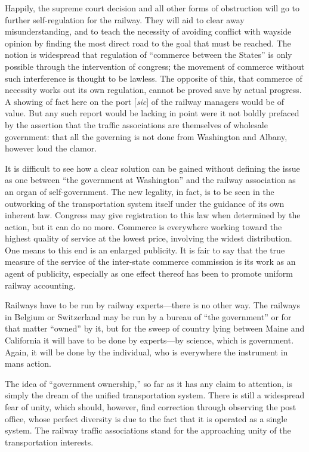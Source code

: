 \documentclass[twoside,symmetric,nobib,justified]{tufte-book}
\begin{document}
Happily, the supreme court decision and all other forms of obstruction
will go to further self-regulation for the railway. They will aid to
clear away misunderstanding, and to teach the necessity of avoiding
conflict with wayside opinion by finding the most direct road to the
goal that must be reached. The notion is widespread that regulation of
``commerce between the States'' is only possible through the
intervention of congress; the movement of commerce without such
interference is thought to be lawless. The opposite of this, that
commerce of necessity works out its own regulation, cannot be proved
save by actual progress. A showing of fact here on the port
{[}\emph{sic}{]} of the railway managers would be of value. But any such
report would be lacking in point were it not boldly prefaced by the
assertion that the traffic associations are themselves of wholesale
government: that all the governing is not done from Washington and
Albany, however loud the clamor.

It is difficult to see how a clear solution can be gained without
defining the issue as one between ``the government at Washington'' and
the railway association as an organ of self-government. The new
legality, in fact, is to be seen in the outworking of the transportation
system itself under the guidance of its own inherent law. Congress may
give registration to this law when determined by the action, but it can
do no more. Commerce is everywhere working toward the highest quality of
service at the lowest price, involving the widest distribution. One
means to this end is an enlarged publicity. It is fair to say that the
true measure of the service of the inter-state commerce commission is
its work as an agent of publicity, especially as one effect thereof has
been to promote uniform railway accounting.

Railways have to be run by railway experts---there is no other way. The
railways in Belgium or Switzerland may be run by a bureau of ``the
government'' or for that matter ``owned'' by it, but for the sweep of
country lying between Maine and California it will have to be done by
experts---by science, which is government. Again, it will be done by the
individual, who is everywhere the instrument in man\textquotesingle s
action.

The idea of ``government ownership,'' so far as it has any claim to
attention, is simply the dream of the unified transportation system.
There is still a widespread fear of unity, which should, however, find
correction through observing the post office, whose perfect diversity is
due to the fact that it is operated as a single system. The railway
traffic associations stand for the approaching unity of the
transportation interests.
\end{document}
